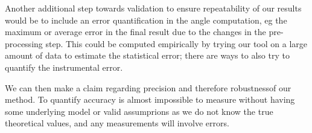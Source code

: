 Another additional step towards validation %
to ensure repeatability of our results would be to include an error quantification in the angle computation, eg the maximum or average error in the final result due to the changes in the pre-processing step. This could be computed empirically by trying our tool on a large amount of data to estimate the statistical error; there are ways to also try to quantify the instrumental error. 

We can then make a claim regarding precision and therefore robustnessof our method. To quantify accuracy is almost impossible to measure without having some underlying model or valid assumprions as we do not know the true theoretical values, and any measurements will involve errors. 


%
%
%
%
%
%
%
%
%
%
%
%
%
%
%
%
%
%
%
%
%
%
